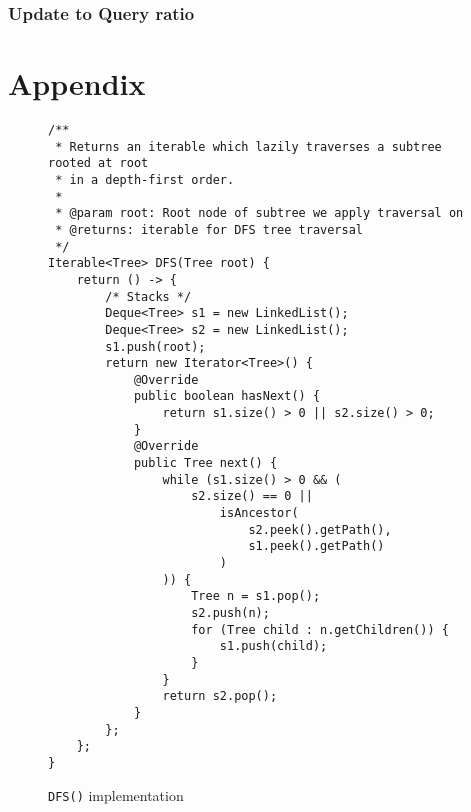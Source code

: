 \message{ !name(thesis.tex)}\documentclass[abstracton,12pt]{scrartcl}
\theoremstyle{definition}
\begin{document}
\subsubsection{Update to Query ratio}






\section{Appendix}

\begin{figure}
  \centering
\begin{verbatim}
/**
 * Returns an iterable which lazily traverses a subtree rooted at root
 * in a depth-first order.
 *
 * @param root: Root node of subtree we apply traversal on
 * @returns: iterable for DFS tree traversal
 */
Iterable<Tree> DFS(Tree root) {
    return () -> {
        /* Stacks */
        Deque<Tree> s1 = new LinkedList();
        Deque<Tree> s2 = new LinkedList();
        s1.push(root);
        return new Iterator<Tree>() {
            @Override
            public boolean hasNext() {
                return s1.size() > 0 || s2.size() > 0;
            }
            @Override
            public Tree next() {
                while (s1.size() > 0 && (
                    s2.size() == 0 ||
                        isAncestor(
                            s2.peek().getPath(),
                            s1.peek().getPath()
                        )
                )) {
                    Tree n = s1.pop();
                    s2.push(n);
                    for (Tree child : n.getChildren()) {
                        s1.push(child);
                    }
                }
                return s2.pop();
            }          
        };
    };
}
\end{verbatim}
  \caption{\texttt{DFS()} implementation}
  \label{fig:java_dfs}
\end{figure}
\end{document}

